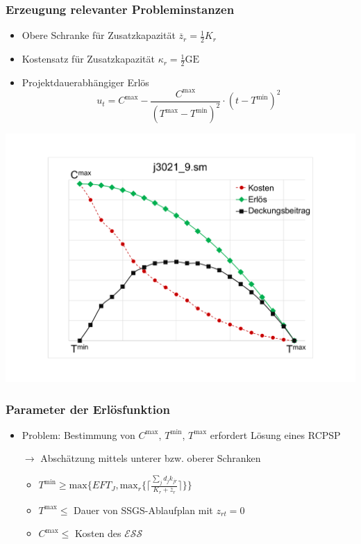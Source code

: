 \begin{frame}[noframenumbering]
\frametitle{Erzeugung relevanter Probleminstanzen}

\begin{itemize}
\item Obere Schranke für Zusatzkapazität $\overline{z}_r=\frac{1}{2}K_r$
\item Kostensatz für Zusatzkapazität $\kappa_r=\frac{1}{2}\mbox{GE}$
\item Projektdauerabhängiger Erlös \[u_{t}=C^{\mbox{max}} - \frac{C^{\mbox{max}}}{(T^{\mbox{max}}-T^{\mbox{min}})^2} \cdot (t-T^{\mbox{min}})^2\]
\end{itemize}

\begin{center}
\includegraphics[scale=0.26]{images/DeadlineCosts.pdf}
\end{center}

\end{frame}


\begin{frame}[noframenumbering]
\frametitle{Parameter der Erlösfunktion}
\begin{itemize}
\item Problem: Bestimmung von $C^{\mbox{max}}$, $T^{\mbox{min}}$, $T^{\mbox{max}}$ erfordert Lösung eines RCPSP\\[5mm]
\item[$\rightarrow$]  Abschätzung mittels unterer bzw. oberer Schranken\\[2mm]
\begin{itemize}
\item $T^{\mbox{min}} \geq \mbox{max}\{EFT_{J},\mbox{max}_{r}\{\lceil\frac{\sum_{j}d_{j}k_{jr}}{K_{r}+\overline{z}_{r}}\rceil\}\}$\\[1mm]
\item $T^{\mbox{max}} \leq$ Dauer von SSGS-Ablaufplan mit $z_{rt}=0$\\[4mm]
\item $C^{\mbox{max}} \leq $ Kosten des $\mathcal{ESS}$
\end{itemize}
\end{itemize}
\end{frame}

